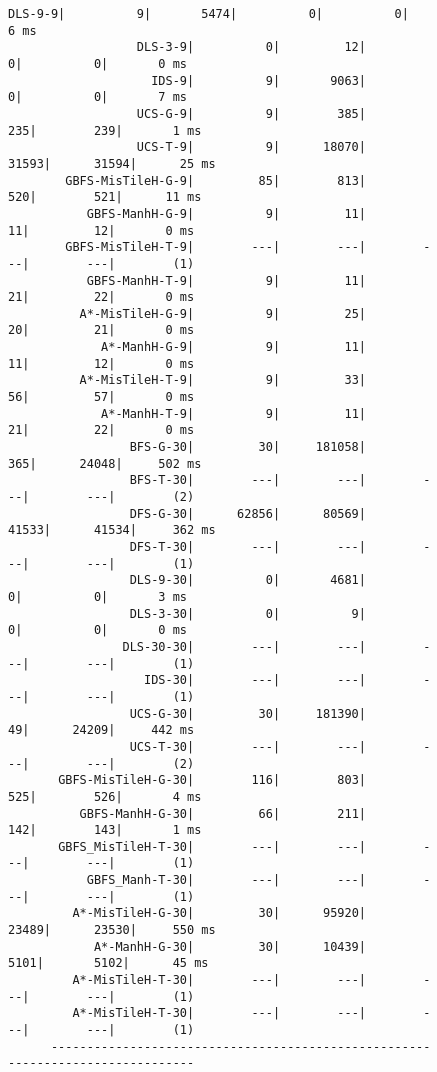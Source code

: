 \documentclass{article}
\begin{document}
\begin{figure}[H]
\begin{Verbatim}[fontsize=\footnotesize]
                  DLS-9-9|          9|       5474|          0|          0|       6 ms
                  DLS-3-9|          0|         12|          0|          0|       0 ms
                    IDS-9|          9|       9063|          0|          0|       7 ms
                  UCS-G-9|          9|        385|        235|        239|       1 ms
                  UCS-T-9|          9|      18070|      31593|      31594|      25 ms
        GBFS-MisTileH-G-9|         85|        813|        520|        521|      11 ms
           GBFS-ManhH-G-9|          9|         11|         11|         12|       0 ms
        GBFS-MisTileH-T-9|        ---|        ---|        ---|        ---|        (1)
           GBFS-ManhH-T-9|          9|         11|         21|         22|       0 ms
          A*-MisTileH-G-9|          9|         25|         20|         21|       0 ms
             A*-ManhH-G-9|          9|         11|         11|         12|       0 ms
          A*-MisTileH-T-9|          9|         33|         56|         57|       0 ms
             A*-ManhH-T-9|          9|         11|         21|         22|       0 ms
                 BFS-G-30|         30|     181058|        365|      24048|     502 ms
                 BFS-T-30|        ---|        ---|        ---|        ---|        (2)
                 DFS-G-30|      62856|      80569|      41533|      41534|     362 ms
                 DFS-T-30|        ---|        ---|        ---|        ---|        (1)
                 DLS-9-30|          0|       4681|          0|          0|       3 ms
                 DLS-3-30|          0|          9|          0|          0|       0 ms
                DLS-30-30|        ---|        ---|        ---|        ---|        (1)
                   IDS-30|        ---|        ---|        ---|        ---|        (1)
                 UCS-G-30|         30|     181390|         49|      24209|     442 ms
                 UCS-T-30|        ---|        ---|        ---|        ---|        (2)
       GBFS-MisTileH-G-30|        116|        803|        525|        526|       4 ms
          GBFS-ManhH-G-30|         66|        211|        142|        143|       1 ms
       GBFS_MisTileH-T-30|        ---|        ---|        ---|        ---|        (1)
           GBFS_Manh-T-30|        ---|        ---|        ---|        ---|        (1)
         A*-MisTileH-G-30|         30|      95920|      23489|      23530|     550 ms
            A*-ManhH-G-30|         30|      10439|       5101|       5102|      45 ms
         A*-MisTileH-T-30|        ---|        ---|        ---|        ---|        (1)
         A*-MisTileH-T-30|        ---|        ---|        ---|        ---|        (1)
      -------------------------------------------------------------------------------
      \end{Verbatim}
\end{figure}
\end{document}
